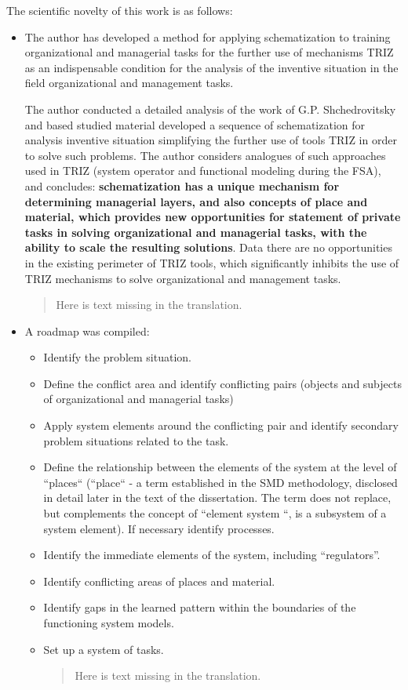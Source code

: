 \documentclass[11pt,a4paper]{book}
\newcommand{\Missing}{
  \begin{quote} Here is text missing in the translation.\end{quote}
}
\begin{document}
The scientific novelty of this work is as follows:
\begin{itemize}
\item The author has developed a method for applying schematization to
  training organizational and managerial tasks for the further use of
  mechanisms TRIZ as an indispensable condition for the analysis of the
  inventive situation in the field organizational and management tasks.

  The author conducted a detailed analysis of the work of G.P. Shchedrovitsky
  and based studied material developed a sequence of schematization for
  analysis inventive situation simplifying the further use of tools TRIZ in
  order to solve such problems. The author considers analogues of such
  approaches used in TRIZ (system operator and functional modeling during the
  FSA), and concludes: \textbf{schematization has a unique mechanism for
    determining managerial layers, and also concepts of place and material,
    which provides new opportunities for statement of private tasks in solving
    organizational and managerial tasks, with the ability to scale the
    resulting solutions}. Data there are no opportunities in the existing
  perimeter of TRIZ tools, which significantly inhibits the use of TRIZ
  mechanisms to solve organizational and management tasks.

\Missing
\item A roadmap was compiled:
  \begin{itemize}
  \item Identify the problem situation.
  \item Define the conflict area and identify conflicting pairs (objects and
    subjects of organizational and managerial tasks)
  \item Apply system elements around the conflicting pair and identify
    secondary problem situations related to the task.
  \item Define the relationship between the elements of the system at the
    level of “places“ (“place“ - a term established in the SMD methodology,
    disclosed in detail later in the text of the dissertation. The term does
    not replace, but complements the concept of “element system “, is a
    subsystem of a system element). If necessary identify processes.
  \item Identify the immediate elements of the system, including “regulators”.
  \item Identify conflicting areas of places and material.
  \item Identify gaps in the learned pattern within the boundaries of the
    functioning system models.
  \item Set up a system of tasks. \Missing
  \end{itemize}


\end{itemize}
\end{document}
